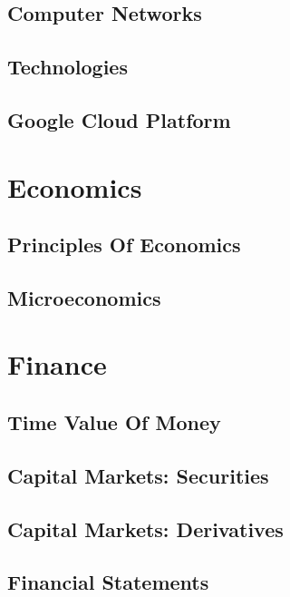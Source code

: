 \documentclass[a4paper, notitlepage]{report}
\begin{document}
\chapter{Computer Networks}


\chapter{Technologies}


\chapter{Google Cloud Platform}


\part{Economics}

\chapter{Principles Of Economics}


\chapter{Microeconomics}


\part{Finance}

\chapter{Time Value Of Money}


\chapter{Capital Markets: Securities}


\chapter{Capital Markets: Derivatives}


\chapter{Financial Statements}


\begin{appendices}

\end{appendices}
\end{document}
